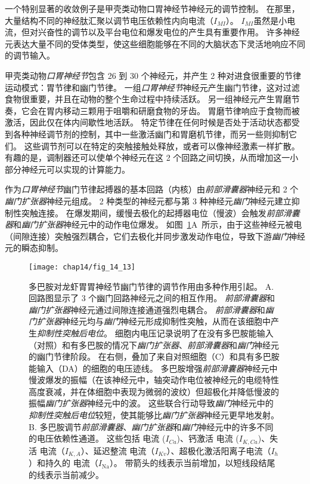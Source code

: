 一个特别显著的收敛例子是甲壳类动物口胃神经节神经元的调节控制。
在那里，大量结构不同的神经肽汇聚以调节电压依赖性内向电流（$I_{MI}$）。
$I_{MI}$虽然是小电流，但对兴奋性的调节以及平台电位和爆发电位的产生具有重要作用。
许多神经元表达大量不同的受体类型，使这些细胞能够在不同的大脑状态下灵活地响应不同的调节输入。


甲壳类动物\textit{口胃神经节}包含 26 到 30 个神经元，并产生 2 种对进食很重要的节律运动模式：胃节律和幽门节律。
一组\textit{口胃神经节}神经元产生幽门节律，这对过滤食物很重要，并且在动物的整个生命过程中持续活跃。
另一组神经元产生胃磨节奏，它会在胃内移动三颗用于咀嚼和研磨食物的牙齿。
胃磨节律响应于食物而被激活，因此仅在体内间歇性地活跃。
特定节律在任何时候是否处于活动状态都受到各种神经调节剂的控制，其中一些激活幽门和胃磨机节律，而另一些则抑制它们。
这些调节剂可以在特定的突触接触处释放，或者可以像神经激素一样扩散。
有趣的是，调制器还可以使单个神经元在这 2 个回路之间切换，从而增加这一小部分神经元可以实现的计算能力。


作为\textit{口胃神经节}幽门节律起搏器的基本回路（内核）由\textit{前部滑囊器}神经元和 2 个\textit{幽门扩张器}神经元组成。
2 种类型的神经元都与第 3 种神经元\textit{幽门}神经元建立抑制性突触连接。
在爆发期间，缓慢去极化的起搏器电位（慢波）会触发\textit{前部滑囊器}和\textit{幽门扩张器}神经元中的动作电位爆发。
如图~\ref{fig:14_13}A~所示，由于这些神经元被电（间隙连接）突触强烈耦合，它们去极化并同步激发动作电位，导致下游\textit{幽门}神经元的瞬态抑制。


\begin{figure}[htbp]
	\centering
	\texttt{[image: chap14/fig\_14\_13]}
	\caption{多巴胺对龙虾胃胃神经节幽门节律的调节作用由多种作用引起。
		A. 回路图显示了 3 个幽门回路神经元之间的相互作用。
		\textit{前部滑囊器}和\textit{幽门扩张器}神经元通过间隙连接通道强烈电耦合。
		\textit{前部滑囊器}和\textit{幽门扩张器}神经元均与\textit{幽门}神经元形成抑制性突触，从而在该细胞中产生\textit{抑制性突触后电位}。
		细胞内电压记录说明了在没有多巴胺能输入（对照）和有多巴胺的情况下\textit{幽门扩张器}、\textit{前部滑囊器}和\textit{幽门}神经元的幽门节律阶段。
		在右侧，叠加了来自对照细胞（C）和具有多巴胺能输入（DA）的细胞的电压迹线。
		多巴胺增强\textit{前部滑囊器}神经元中慢波爆发的振幅（在该神经元中，轴突动作电位被神经元的电缆特性高度衰减，并在体细胞中表现为微弱的波纹）但超极化并降低慢波的振幅\textit{幽门扩张器}神经元中的波。
		这些联合行动导致\textit{幽门}神经元中的\textit{抑制性突触后电位}较短，使其能够比\textit{幽门扩张器}神经元更早地发射\cite{eisen1984mechanism}。
		B. 多巴胺调节\textit{前部滑囊器}、\textit{幽门扩张器}和\textit{幽门}神经元中的许多不同的电压依赖性通道。
		这些包括  电流 ($I_{Ca}$)、钙激活  电流 ($I_{K,Ca}$)、失活  电流（$I_{K,A}$）、延迟整流  电流（$I_{Kv}$）、超极化激活阳离子电流（$I_h$）和持久的  电流（$I_\text{Na}$）。
		带箭头的线表示当前增加，以短线段结尾的线表示当前减少\cite{marder2007understanding,harris2011neuromodulation}。}
	\label{fig:14_13}
\end{figure}


